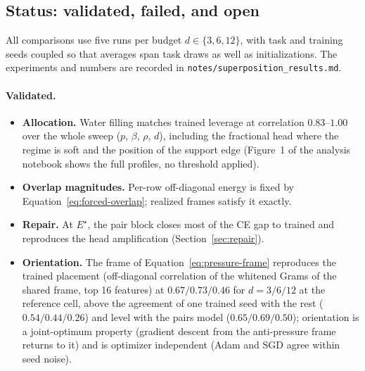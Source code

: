 \subsection{Status: validated, failed, and open}

All comparisons use five runs per budget \(d\in\{3,6,12\}\), with task and training
seeds coupled so that averages span task draws as well as initializations. The
experiments and numbers are recorded in \texttt{notes/superposition\_results.md}.

\paragraph{Validated.}
\begin{itemize}
\item \textbf{Allocation.} Water filling matches trained leverage at correlation
\(0.83\)--\(1.00\) over the whole sweep (\(p\), \(\beta\), \(\rho\), \(d\)), including
the fractional head where the regime is soft and the position of the support edge
(Figure~1 of the analysis notebook shows the full profiles, no threshold applied).
\item \textbf{Overlap magnitudes.} Per-row off-diagonal energy is fixed by
Equation~\eqref{eq:forced-overlap}; realized frames satisfy it exactly.
\item \textbf{Repair.} At \(E^\star\), the pair block closes most of the CE gap to
trained and reproduces the head amplification (Section~\ref{sec:repair}).
\item \textbf{Orientation.} The frame of Equation~\eqref{eq:pressure-frame} reproduces
the trained placement (off-diagonal correlation of the whitened Grams of the shared
frame, top 16 features) at \(0.67/0.73/0.46\) for \(d=3/6/12\) at the reference cell,
above the agreement of one trained seed with the rest (\(0.54/0.44/0.26\)) and level
with the pairs model (\(0.65/0.69/0.50\)); orientation is a joint-optimum property
(gradient descent from the anti-pressure frame returns to it) and is optimizer
independent (Adam and SGD agree within seed noise).
\end{itemize}

